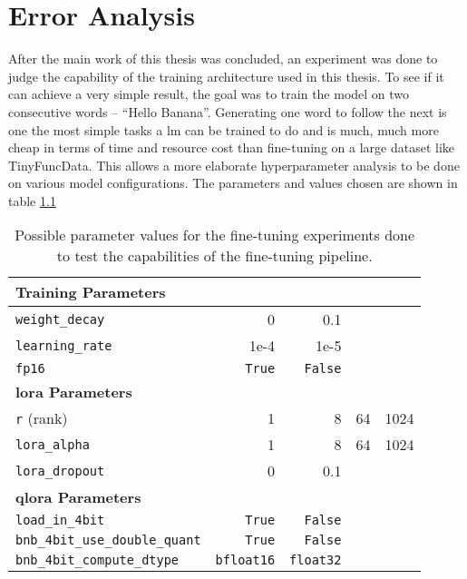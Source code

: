 \chapter{Error Analysis}
\label{sec:error}
After the main work of this thesis was concluded, an experiment was done to judge the capability of the training architecture used in this thesis.
To see if it can achieve a very simple result, the goal was to train the model on two consecutive words -- \enquote{Hello Banana}.
Generating one word to follow the next is one the most simple tasks a \ac{lm} can be trained to do and is much, much more cheap in terms of time and resource cost than fine-tuning on a large dataset like TinyFuncData.
This allows a more elaborate hyperparameter analysis to be done on various model configurations.
The parameters and values chosen are shown in table \ref{tab:parameters}

\begin{table}[!h]
    \centering
    \caption{Possible parameter values for the fine-tuning experiments done to test the capabilities of the fine-tuning pipeline.}
    \begin{tabular}{l|r|r|r|r}
        \hline
        \textbf{Training Parameters} \\
        \hline
        \texttt{weight\_decay} & 0 & 0.1 \\
        \texttt{learning\_rate} & 1e-4 & 1e-5 \\
        \texttt{fp16} & \texttt{True} & \texttt{False} \\
        \hline
        \textbf{\ac{lora} Parameters} \\
        \hline
        \texttt{r} (rank) & 1 & 8 & 64 & 1024 \\
        \texttt{lora\_alpha} & 1 & 8 & 64 & 1024 \\
        \texttt{lora\_dropout} & 0 & 0.1 & \\
        \hline
        \textbf{\ac{qlora} Parameters} \\
        \hline
        \texttt{load\_in\_4bit} & \texttt{True} & \texttt{False} \\
        \texttt{bnb\_4bit\_use\_double\_quant} & \texttt{True} & \texttt{False} \\
        \texttt{bnb\_4bit\_compute\_dtype} & \texttt{bfloat16} & \texttt{float32} \\
        \hline
    \end{tabular}
    \label{tab:parameters}
\end{table}

